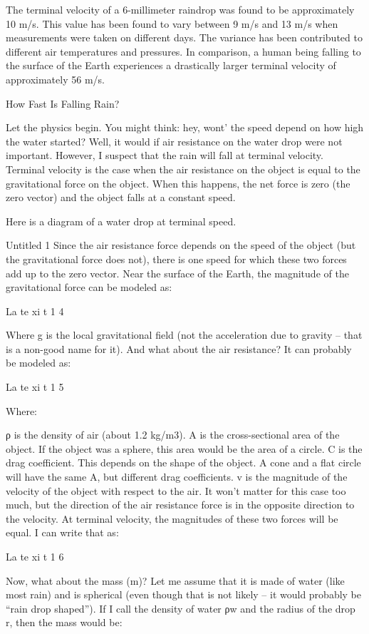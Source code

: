 The terminal velocity of a 6-millimeter raindrop was found to be approximately 10 m/s. This value has been found to vary between 9 m/s and 13 m/s when measurements were taken on different days. The variance has been contributed to different air temperatures and pressures. In comparison, a human being falling to the surface of the Earth experiences a drastically larger terminal velocity of approximately 56 m/s.


How Fast Is Falling Rain? \cite{evan2007}

Let the physics begin. You might think: hey, wont’ the speed depend on how high the water started? Well, it would if air resistance on the water drop were not important. However, I suspect that the rain will fall at terminal velocity. Terminal velocity is the case when the air resistance on the object is equal to the gravitational force on the object. When this happens, the net force is zero (the zero vector) and the object falls at a constant speed.

Here is a diagram of a water drop at terminal speed.

Untitled 1
Since the air resistance force depends on the speed of the object (but the gravitational force does not), there is one speed for which these two forces add up to the zero vector. Near the surface of the Earth, the magnitude of the gravitational force can be modeled as:

La te xi t 1 4

Where g is the local gravitational field (not the acceleration due to gravity – that is a non-good name for it). And what about the air resistance? It can probably be modeled as:

La te xi t 1 5

Where:

ρ is the density of air (about 1.2 kg/m3).
A is the cross-sectional area of the object. If the object was a sphere, this area would be the area of a circle.
C is the drag coefficient. This depends on the shape of the object. A cone and a flat circle will have the same A, but different drag coefficients.
v is the magnitude of the velocity of the object with respect to the air.
It won’t matter for this case too much, but the direction of the air resistance force is in the opposite direction to the velocity.
At terminal velocity, the magnitudes of these two forces will be equal. I can write that as:

La te xi t 1 6

Now, what about the mass (m)? Let me assume that it is made of water (like most rain) and is spherical (even though that is not likely – it would probably be “rain drop shaped”). If I call the density of water ρw and the radius of the drop r, then the mass would be:

